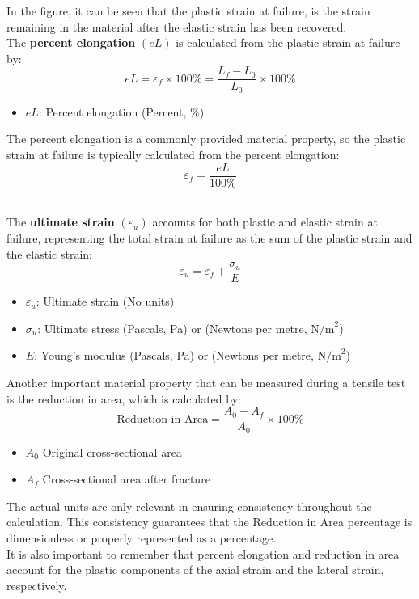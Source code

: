 \documentclass{article}
\begin{document}
\begin{minipage}{0.51\textwidth}
In the figure, it can be seen that the plastic strain at failure, is the strain remaining in the material after the elastic strain has been recovered.\\[8pt]
The \textbf{percent elongation} \((eL)\) is calculated from the plastic strain at failure by:
\begin{equation}
    eL = \varepsilon_f \times 100\% = \frac{L_f - L_0}{L_0} \times 100\%
\end{equation}
\begin{itemize}[itemsep=-1mm]
    \item $eL$: Percent elongation (Percent, \%)
\end{itemize}
The percent elongation is a commonly provided material property, so the plastic strain at failure is typically calculated from the percent elongation:
\begin{equation}
    \varepsilon_f = \frac{eL}{100\%}
\end{equation}
\end{minipage}\\[8pt]
The \textbf{ultimate strain} $(\varepsilon_u)$ accounts for both plastic and elastic strain at failure, representing the total strain at failure as the sum of the plastic strain and the elastic strain:
\begin{equation}
    \varepsilon_u = \varepsilon_f + \frac{\sigma_{u}}{E}
\end{equation}
\begin{itemize}[itemsep=-1mm]
    \item $\varepsilon_u$: Ultimate strain (No units)
    \item $\sigma_{u}$: Ultimate stress (Pascals, Pa) or (Newtons per metre, \(\text{N/m}^2\))
    \item $E$: Young's modulus (Pascals, Pa) or (Newtons per metre, \(\text{N/m}^2\))
\end{itemize}
\newpage
Another important material property that can be measured during a tensile test is the reduction in area, which is calculated by:
\begin{equation}
    \text{Reduction in Area} = \frac{A_0 - A_f}{A_0} \times 100\%
\end{equation}
\begin{itemize}[itemsep=-1mm]
    \item $A_0$ Original cross-sectional area
    \item $A_f$ Cross-sectional area after fracture
\end{itemize}
The actual units are only relevant in ensuring consistency throughout the calculation. This consistency guarantees that the Reduction in Area percentage is dimensionless or properly represented as a percentage.\\ It is also important to remember that percent elongation and reduction in area account for the plastic components of the axial strain and the lateral strain, respectively.\\
\end{document}
